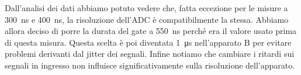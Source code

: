 Dall'analisi dei dati abbiamo potuto vedere che, fatta eccezione per le misure a \SI{300}{ns} e \SI{400}{ns}, la risoluzione dell'ADC è compatibilmente la stessa.
Abbiamo allora deciso di porre la durata del gate a \SI{550}{ns} perché era il valore usato prima di questa misura.
Questa scelta è poi diventata \SI{1}{\micro s} nell'apparato B per evitare problemi derivanti dal jitter dei segnali. Infine notiamo che cambiare i ritardi sui segnali in ingresso non influisce significativamente sulla risoluzione dell'apparato.